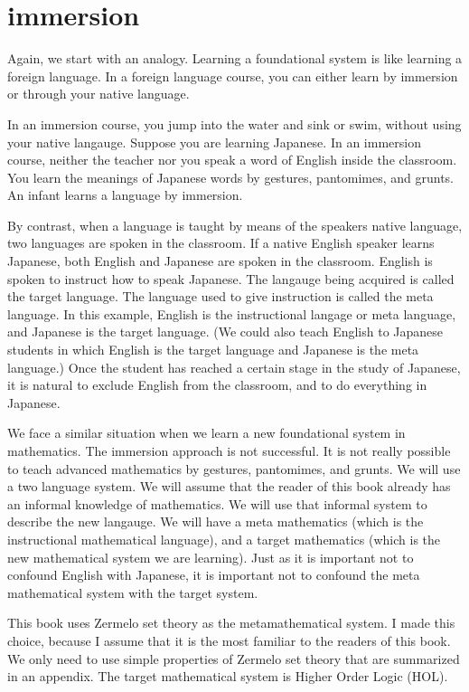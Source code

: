 \documentclass[cup9a]{cupbook}
\begin{document}
\section{immersion}

Again, we start with an analogy.  Learning a foundational system is like learning a foreign language.  In a foreign language course, you can either learn by immersion or through your native language.  

In an immersion course, you jump into the water and sink or swim, without using your native langauge.  Suppose you are learning Japanese.  In an immersion course, neither the teacher nor you speak a word of English inside the classroom.  You learn the meanings of Japanese words by gestures, pantomimes, and grunts.  An infant learns a language by immersion.  

By contrast, when a language is taught by means of the speakers native language, two languages are spoken in the classroom.  If a native English speaker learns Japanese, both English and Japanese are spoken in the classroom.  English is spoken to instruct how to speak Japanese.   The langauge being acquired is called the target language.  The language used to give instruction is called the meta language.  In this example, English is the instructional langage or meta language, and Japanese is the target language.  (We could also teach English to Japanese students in which English is the target language and Japanese is the meta language.)  Once the student has reached a certain stage in the study of Japanese, it is natural to exclude English from the classroom, and to do everything in Japanese.

We face a similar situation when we learn a new foundational system in mathematics.  The immersion approach is not successful.  It is not really possible to teach advanced mathematics by gestures, pantomimes, and grunts.  We will use a two language system.  We will assume that the reader of this book already has an informal knowledge of mathematics.  We will use that informal system to describe the new langauge.  We will have a meta mathematics (which is the instructional mathematical language), and a target mathematics (which is the new mathematical system we are learning).  
Just as it is important not to confound English with Japanese, it is important not to confound the meta mathematical system with the target system.

This book uses Zermelo set theory as the metamathematical system.  I made this choice, because I assume that it is the most familiar to the readers of this book.  We only need to use simple properties of Zermelo set theory that are summarized in an appendix.  The target mathematical system is Higher Order Logic (HOL).  
\end{document}
